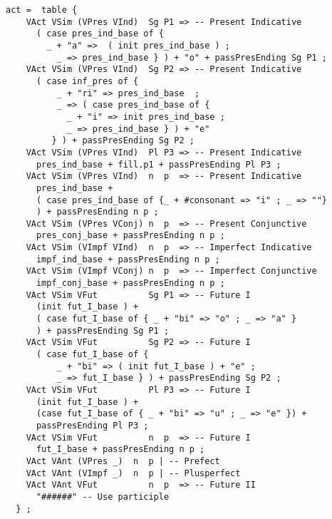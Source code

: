 \begin{lstlisting}[float=h!tp,caption={Ausschnitt aus der Funktion \texttt{mkDeponent} um Aktiv-Verbformen zu bilden (vgl. \textbf{ResLat.gf})},label={GF-Res-MkDeponent-Act},basicstyle=\small]
act =  table {
    VAct VSim (VPres VInd)  Sg P1 => -- Present Indicative
      ( case pres_ind_base of { 
        _ + "a" =>  ( init pres_ind_base ) ;
          _ => pres_ind_base } ) + "o" + passPresEnding Sg P1 ;
    VAct VSim (VPres VInd)  Sg P2 => -- Present Indicative
      ( case inf_pres of {
          _ + "ri" => pres_ind_base  ;
          _ => ( case pres_ind_base of {
            _ + "i" => init pres_ind_base ; 
            _ => pres_ind_base } ) + "e" 
         } ) + passPresEnding Sg P2 ;
    VAct VSim (VPres VInd)  Pl P3 => -- Present Indicative
      pres_ind_base + fill.p1 + passPresEnding Pl P3 ;
    VAct VSim (VPres VInd)  n  p  => -- Present Indicative
      pres_ind_base +
      ( case pres_ind_base of {_ + #consonant => "i" ; _ => ""}
      ) + passPresEnding n p ;
    VAct VSim (VPres VConj) n  p  => -- Present Conjunctive
      pres_conj_base + passPresEnding n p ; 
    VAct VSim (VImpf VInd)  n  p  => -- Imperfect Indicative
      impf_ind_base + passPresEnding n p ;
    VAct VSim (VImpf VConj) n  p  => -- Imperfect Conjunctive
      impf_conj_base + passPresEnding n p ;
    VAct VSim VFut          Sg P1 => -- Future I
      (init fut_I_base ) + 
      ( case fut_I_base of { _ + "bi" => "o" ; _ => "a" }
      ) + passPresEnding Sg P1 ;
    VAct VSim VFut          Sg P2 => -- Future I
      ( case fut_I_base of { 
          _ + "bi" => ( init fut_I_base ) + "e" ;
          _ => fut_I_base } ) + passPresEnding Sg P2 ;
    VAct VSim VFut          Pl P3 => -- Future I
      (init fut_I_base ) + 
      (case fut_I_base of { _ + "bi" => "u" ; _ => "e" }) + 
      passPresEnding Pl P3 ;
    VAct VSim VFut          n  p  => -- Future I
      fut_I_base + passPresEnding n p ;
    VAct VAnt (VPres _)  n  p | -- Prefect 
    VAct VAnt (VImpf _)  n  p | -- Plusperfect
    VAct VAnt VFut          n  p  => -- Future II 
      "######" -- Use participle
  } ; 
\end{lstlisting}
